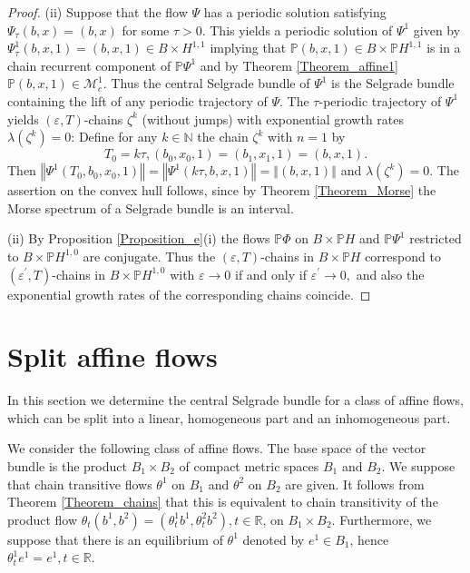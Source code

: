 \begin{proof}
		(ii) Suppose that the flow $\Psi$ has a periodic solution satisfying
		$\Psi_{\tau}(b,x)\allowbreak=(b,x)$ for some $\tau>0$. This yields a periodic
		solution of $\Psi^{1}$ given by $\Psi_{\tau}^{1}(b,x,1)\allowbreak=(b,x,1)\in
		B\times H^{1,1}$ implying that $\mathbb{P}(b,x,1)\in B\times\mathbb{P}H^{1,1}$
		is in a chain recurrent component of $\mathbb{P}\Psi^{1}$ and by Theorem
		\ref{Theorem_affine1} $\mathbb{P}(b,x,1)\in\mathcal{M}_{c}^{1}$. Thus the
		central Selgrade bundle of $\Psi^{1}$ is the Selgrade bundle containing the
		lift of any periodic trajectory of $\Psi$. The $\tau$-periodic trajectory of
		$\Psi^{1}$ yields $(\varepsilon,T)$-chains $\zeta^{k}$ (without jumps) with
		exponential growth rates $\lambda(\zeta^{k})=0$: Define for any $k\in
		\mathbb{N}$ the chain $\zeta^{k}$ with $n=1$ by%
		\[
		T_{0}=k\tau,(b_{0},x_{0},1)=(b_{1},x_{1},1)=(b,x,1).
		\]
		Then $\left\Vert \Psi^{1}(T_{0},b_{0},x_{0},1)\right\Vert =\left\Vert \Psi
		^{1}(k\tau,b,x,1)\right\Vert =\left\Vert (b,x,1)\right\Vert $ and
		$\lambda(\zeta^{k})=0$. The assertion on the convex hull follows, since by
		Theorem \ref{Theorem_Morse} the Morse spectrum of a Selgrade bundle is an interval.
		
		(ii) By Proposition \ref{Proposition_e}(i) the flows $\mathbb{P}\Phi$ on
		$B\times\mathbb{P}H$ and $\mathbb{P}\Psi^{1}$ restricted to $B\times
		\mathbb{P}H^{1,0}$ are conjugate. Thus the $(\varepsilon,T)$-chains in
		$B\times\mathbb{P}H$ correspond to $(\varepsilon^{\prime},T)$-chains in
		$B\times\mathbb{P}H^{1,0}$ with $\varepsilon\rightarrow0$ if and only if
		$\varepsilon^{\prime}\rightarrow0,$ and also the exponential growth rates of
		the corresponding chains coincide.
	\end{proof}
	
	\section{Split affine flows\label{Section4}}
	
	In this section we determine the central Selgrade bundle for a class of affine
	flows, which can be split into a linear, homogeneous part and an inhomogeneous part.
	
	We consider the following class of affine flows. The base space of the vector
	bundle is the product $B_{1}\times B_{2}$ of compact metric spaces $B_{1}$ and
	$B_{2}$. We suppose that chain transitive flows $\theta^{1}$ on $B_{1}$ and
	$\theta^{2}$ on $B_{2}$ are given. It follows from Theorem
	\ref{Theorem_chains} that this is equivalent to chain transitivity of the
	product flow $\theta_{t}(b^{1},b^{2})=(\theta_{t}^{1}b^{1},\theta_{t}^{2}
	b^{2}),t\in\mathbb{R}$, on $B_{1}\times B_{2}$. Furthermore, we suppose that
	there is an equilibrium of $\theta^{1}$ denoted by $e^{1}\in B_{1}$, hence
	$\theta_{t}^{1}e^{1}=e^{1},t\in\mathbb{R}$.
	
